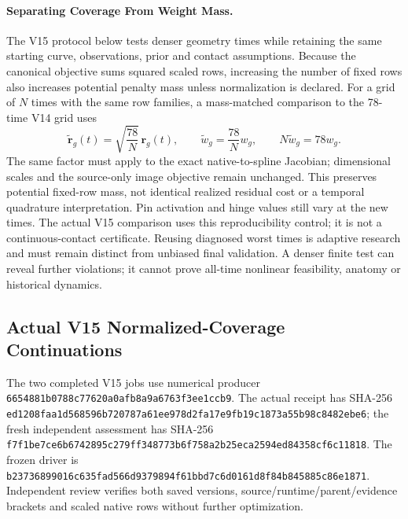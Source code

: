 \documentclass[11pt,letterpaper]{article}
\newcommand{\code}[1]{\nolinkurl{#1}}
\newcommand{\hash}[1]{{\footnotesize\nolinkurl{#1}}}
\begin{document}
\paragraph{Separating Coverage From Weight Mass.}
The V15 protocol below tests denser geometry times while retaining the same
starting curve, observations, prior and contact assumptions. Because the canonical
objective sums squared scaled rows, increasing the number of fixed rows also
increases potential penalty mass unless normalization is declared. For a
grid of $N$ times with the same row families, a mass-matched comparison
to the 78-time V14 grid uses
\begin{equation}
 \widetilde{\mathbf r}_g(t)
 =\sqrt{\frac{78}{N}}\,\mathbf r_g(t),
 \qquad \widetilde w_g=\frac{78}{N}w_g,
 \qquad N\widetilde w_g=78w_g.
 \label{eq:future-coverage-normalization}
\end{equation}
The same factor must apply to the exact native-to-spline Jacobian; dimensional
scales and the source-only image objective remain unchanged. This preserves
potential fixed-row mass, not identical realized residual cost or a temporal
quadrature interpretation. Pin activation and hinge values still vary at the
new times. The actual V15 comparison uses this reproducibility control; it is not a
continuous-contact certificate. Reusing diagnosed worst
times is adaptive research and must remain distinct from unbiased final
validation. A denser finite test can reveal further violations; it cannot
prove all-time nonlinear feasibility, anatomy or historical dynamics.

\subsection{Actual V15 Normalized-Coverage Continuations}
\label{sec:v15-coverage}
The two completed V15 jobs use numerical producer
\code{6654881b0788c77620a0afb8a9a6763f3ee1ccb9}. The actual receipt
 has SHA-256
\hash{ed1208faa1d568596b720787a61ee978d2fa17e9fb19c1873a55b98c8482ebe6};
the fresh independent assessment has SHA-256
\hash{f7f1be7ce6b6742895c279ff348773b6f758a2b25eca2594ed84358cf6c11818}.
The frozen driver is
\hash{b23736899016c635fad566d9379894f61bbd7c6d0161d8f84b845885c86e1871}.
Independent review verifies both saved versions, source/runtime/parent/evidence
brackets and scaled native rows without further optimization.
\end{document}
